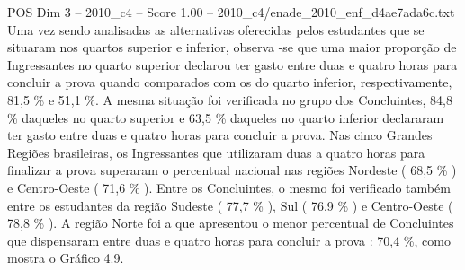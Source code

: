 \begin{textsample}{POS Dim 3 – 2010\_c4 – Score 1.00 – 2010\_c4/enade\_2010\_enf\_d4ae7ada6c.txt}
Uma vez sendo analisadas as alternativas oferecidas pelos estudantes que se situaram nos quartos superior e inferior, observa -se que uma maior proporção de Ingressantes no quarto superior declarou ter gasto entre duas e quatro horas para concluir a prova quando comparados com os do quarto inferior, respectivamente, 81,5 \% e 51,1 \%.
A mesma situação foi verificada no grupo dos Concluintes, 84,8 \% daqueles no quarto superior e 63,5 \% daqueles no quarto inferior declararam ter gasto entre duas e quatro horas para concluir a prova.
Nas cinco Grandes Regiões brasileiras, os Ingressantes que utilizaram duas a quatro horas para finalizar a prova superaram o percentual nacional nas regiões Nordeste ( 68,5 \% ) e Centro-Oeste ( 71,6 \% ).
Entre os Concluintes, o mesmo foi verificado também entre os estudantes da região Sudeste ( 77,7 \% ), Sul ( 76,9 \% ) e Centro-Oeste ( 78,8 \% ).
A região Norte foi a que apresentou o menor percentual de Concluintes que dispensaram entre duas e quatro horas para concluir a prova : 70,4 \%, como mostra o Gráfico 4.9.

\end{textsample}
